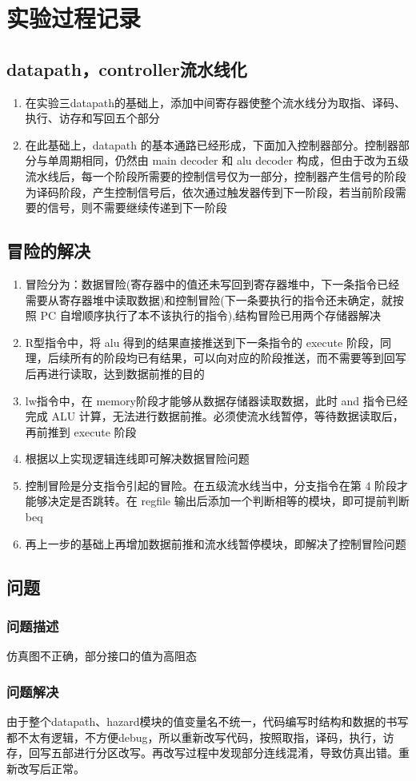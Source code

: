 \section{实验过程记录}

\subsection{datapath，controller流水线化}
\begin{enumerate}
    \item 在实验三datapath的基础上，添加中间寄存器使整个流水线分为取指、译码、执行、访存和写回五个部分
    \item 在此基础上，datapath 的基本通路已经形成，下面加入控制器部分。控制器部分与单周期相同，仍然由 main decoder 和 alu decoder 构成，但由于改为五级流水线后，每一个阶段所需要的控制信号仅为一部分，控制器产生信号的阶段为译码阶段，产生控制信号后，依次通过触发器传到下一阶段，若当前阶段需要的信号，则不需要继续传递到下一阶段
\end{enumerate}

\subsection{冒险的解决}
\begin{enumerate}
    \item 冒险分为：数据冒险(寄存器中的值还未写回到寄存器堆中，下一条指令已经需要从寄存器堆中读取数据)和控制冒险(下一条要执行的指令还未确定，就按照 PC 自增顺序执行了本不该执行的指令),结构冒险已用两个存储器解决
    \item R型指令中，将 alu 得到的结果直接推送到下一条指令的 execute 阶段，同理，后续所有的阶段均已有结果，可以向对应的阶段推送，而不需要等到回写后再进行读取，达到数据前推的目的
    \item lw指令中，在 memory阶段才能够从数据存储器读取数据，此时 and 指令已经完成 ALU 计算，无法进行数据前推。必须使流水线暂停，等待数据读取后，再前推到 execute 阶段
    \item 根据以上实现逻辑连线即可解决数据冒险问题
    \item 控制冒险是分支指令引起的冒险。在五级流水线当中，分支指令在第 4 阶段才能够决定是否跳转。在 regfile 输出后添加一个判断相等的模块，即可提前判断 beq
    \item 再上一步的基础上再增加数据前推和流水线暂停模块，即解决了控制冒险问题
\end{enumerate}

\subsection{问题}
\subsubsection{问题描述}
仿真图不正确，部分接口的值为高阻态
\subsubsection{问题解决}
由于整个datapath、hazard模块的值变量名不统一，代码编写时结构和数据的书写都不太有逻辑，不方便debug，所以重新改写代码，按照取指，译码，执行，访存，回写五部进行分区改写。再改写过程中发现部分连线混淆，导致仿真出错。重新改写后正常。